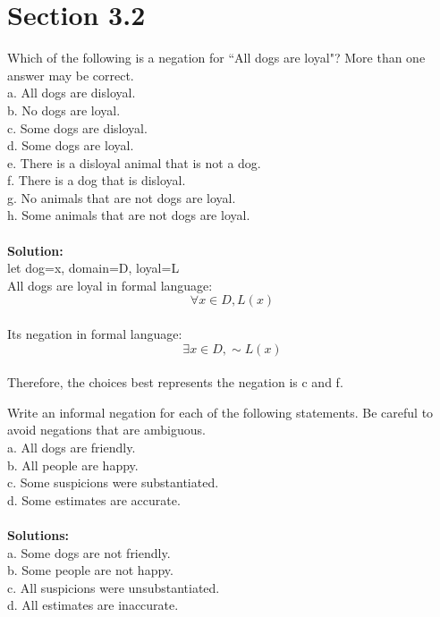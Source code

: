 \documentclass[11pt]{article}
\newenvironment{exercise}[2][Exercise]{\begin{trivlist}
\item[\hskip \labelsep {\bfseries #1}\hskip \labelsep {\bfseries #2.}]}{\end{trivlist}}
\begin{document}
\section*{Section 3.2}
\begin{exercise}{2}
Which of the following is a negation for ``All dogs are loyal"? More than one answer may be correct.\\
a. All dogs are disloyal.\\
b. No dogs are loyal.\\
c. Some dogs are disloyal.\\
d. Some dogs are loyal.\\
e. There is a disloyal animal that is not a dog. \\
f. There is a dog that is disloyal.\\
g. No animals that are not dogs are loyal.\\
h. Some animals that are not dogs are loyal.\\
\\
\textbf{Solution:}\\
let dog=x, domain=D, loyal=L\\
All dogs are loyal in formal language:\\
$$ \forall x \in D, L(x) $$\\
Its negation in formal language:\\
$$ \exists x \in D, \sim L(x)$$\\
Therefore, the choices best represents the negation is c and f.
\end{exercise}

\begin{exercise}{4}
Write an informal negation for each of the following statements.
Be careful to avoid negations that are ambiguous.\\
a. All dogs are friendly.\\
b. All people are happy.\\
c. Some suspicions were substantiated.\\
d. Some estimates are accurate. \\
\\
\textbf{Solutions:}\\
a. Some dogs are not friendly.\\
b. Some people are not happy.\\
c. All suspicions were unsubstantiated.\\
d. All estimates are inaccurate.\\

\end{exercise}

\end{document}

